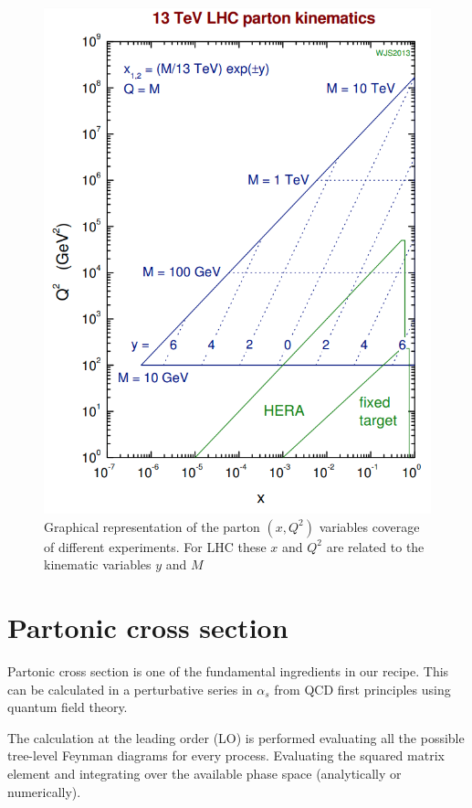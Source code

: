 \begin{figure}[!ht]
	\centering 	
	\includegraphics[width=12cm]{img/xQ2planeCoverage.png}
	\caption{Graphical representation of the parton $(x,Q^2)$ variables coverage of different experiments. For LHC these $x$ and $Q^2$ are related to the kinematic variables $y$ and $M$}
		\label{figure:xQ2planeCoverage}
\end{figure}

\section{Partonic cross section}

Partonic cross section is one of the fundamental ingredients in our recipe. This can be calculated in a perturbative series in $\alpha_s$ from QCD first principles using quantum field theory.

The calculation at the leading order (LO) is performed evaluating all the possible tree-level Feynman diagrams for every process. Evaluating the squared matrix element and integrating over the available phase space (analytically or numerically).

